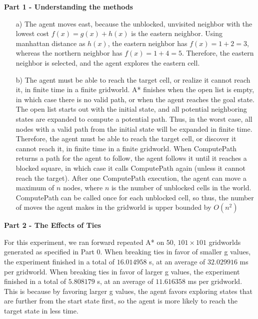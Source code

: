 \documentclass[11pt]{article}
\begin{document}
    \begin{center}
        \Large
        \textbf{Part 1 - Understanding the methods}
    \end{center}
    \normalsize
    \begin{enumerate}
        \item[a)] The agent moves east, because the unblocked,
        unvisited neighbor with the lowest cost $f(x) = g(x) + h(x)$ is the eastern neighbor.
        Using manhattan distance as $h(x)$, the eastern neighbor has $f(x) = 1 + 2 = 3$,
        whereas the northern neighbor has $f(x) = 1 + 4 = 5$.
        Therefore, the eastern neighbor is selected, and the agent explores the eastern cell.
        \item[b)] The agent must be able to reach the target cell, or realize it cannot reach it, in finite time in a finite gridworld.
        A* finishes when the open list is empty, in which case there is no valid path, or when the agent reaches the goal state.
        The open list starts out with the initial state, and all potential neighboring states are expanded to compute a potential path.
        Thus, in the worst case, all nodes with a valid path from the initial state will be expanded in finite time.
        Therefore, the agent must be able to reach the target cell, or discover it cannot reach it, in finite time in a finite gridworld.
        \newline\newline
        When ComputePath returns a path for the agent to follow, the agent follows it until it reaches a blocked square,
        in which case it calls ComputePath again (unless it cannot reach the target).
        After one ComputePath execution, the agent can move a maximum of $n$ nodes, where $n$ is the number
        of unblocked cells in the world.
        ComputePath can be called once for each unblocked cell, so thus, the number of moves the agent makes in the gridworld
        is upper bounded by $O(n^2)$
    \end{enumerate}

    \begin{center}
        \Large
        \textbf{Part 2 - The Effects of Ties}
    \end{center}
    \normalsize
    For this experiment, we ran forward repeated A* on $50$, $101 \times 101$ gridworlds generated as specified in Part 0.
    When breaking ties in favor of smaller g values, the experiment finished in a total of $16.014958$ s, at an average of $32.029916$ ms per gridworld.
    When breaking ties in favor of larger g values, the experiment finished in a total of $5.808179$ s, at an average of $11.616358$ ms per gridworld.
    \newline\newline
    This is because by favoring larger g values, the agent favors exploring states that are further from the start state first, so the agent
    is more likely to reach the target state in less time.
    
\end{document}
